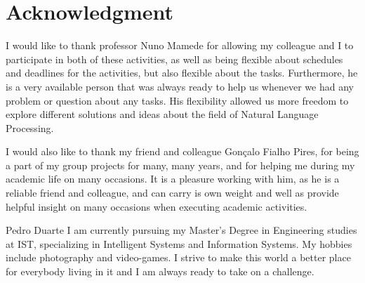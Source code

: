 \documentclass[a4paper,12pt,journal,twoside,compsoc]{PPIEEEtran}
\begin{document}
  \section*{} %
\else
  \section*{Acknowledgment}
\fi

I would like to thank professor Nuno Mamede for allowing my colleague and I to participate in both of these activities, as well as being flexible about schedules and deadlines for the activities, but also flexible about the tasks. Furthermore, he is a very available person that was always ready to help us whenever we had any problem or question about any tasks. His flexibility allowed us more freedom to explore different solutions and ideas about the field of Natural Language Processing. 

I would also like to thank my friend and colleague Gonçalo Fialho Pires, for being a part of my group projects for many, many years, and for helping me during my academic life on many occasions. It is a pleasure working with him, as he is a reliable friend and colleague, and can carry is own weight and well as provide helpful insight on many occasions when executing academic activities.



%

% 

\begin{IEEEbiography}{Pedro Duarte}
I am currently pursuing my Master's Degree in Engineering studies at \ac{IST}, specializing in Intelligent Systems and Information Systems. My hobbies include photography and video-games. I strive to make this world a better place for everybody living in it and I am always ready to take on a challenge.
\end{IEEEbiography}
\end{document}
